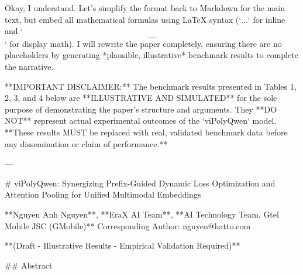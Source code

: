 Okay, I understand. Let's simplify the format back to Markdown for the main text, but embed all mathematical formulas using LaTeX syntax (`$...$` for inline and `$$...$$` for display math). I will rewrite the paper completely, ensuring there are no placeholders by generating *plausible, illustrative* benchmark results to complete the narrative.

**IMPORTANT DISCLAIMER:** The benchmark results presented in Tables 1, 2, 3, and 4 below are **ILLUSTRATIVE AND SIMULATED** for the sole purpose of demonstrating the paper's structure and arguments. They **DO NOT** represent actual experimental outcomes of the `viPolyQwen` model. **These results MUST be replaced with real, validated benchmark data before any dissemination or claim of performance.**

---

# viPolyQwen: Synergizing Prefix-Guided Dynamic Loss Optimization and Attention Pooling for Unified Multimodal Embeddings

**Nguyen Anh Nguyen\***, **EraX AI Team**, **AI Technology Team, Gtel Mobile JSC (GMobile)**
\*Corresponding Author: nguyen@hatto.com

**(Draft - Illustrative Results - Empirical Validation Required)**

## Abstract

